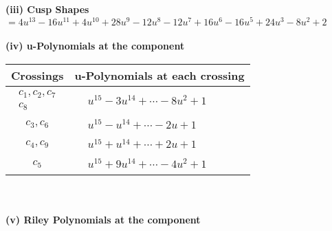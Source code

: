 \documentclass[1p]{elsarticle_modified}
\theoremstyle{definition}
\begin{document}
\flushleft \textbf{(iii) Cusp Shapes $= 4 u^{13}-16 u^{11}+4 u^{10}+28 u^9-12 u^8-12 u^7+16 u^6-16 u^5+24 u^3-8 u^2+2$}\\~\\
\newpage\renewcommand{\arraystretch}{1}
\flushleft \textbf{(iv) u-Polynomials at the component}\newline \\
\begin{tabular}{m{50pt}|m{274pt}}
Crossings & \hspace{64pt}u-Polynomials at each crossing \\
\hline $$\begin{aligned}c_{1},c_{2},c_{7}\\c_{8}\end{aligned}$$&$\begin{aligned}
&u^{15}-3 u^{14}+\cdots-8 u^2+1
\end{aligned}$\\
\hline $$\begin{aligned}c_{3},c_{6}\end{aligned}$$&$\begin{aligned}
&u^{15}- u^{14}+\cdots-2 u+1
\end{aligned}$\\
\hline $$\begin{aligned}c_{4},c_{9}\end{aligned}$$&$\begin{aligned}
&u^{15}+u^{14}+\cdots+2 u+1
\end{aligned}$\\
\hline $$\begin{aligned}c_{5}\end{aligned}$$&$\begin{aligned}
&u^{15}+9 u^{14}+\cdots-4 u^2+1
\end{aligned}$\\
\hline
\end{tabular}\\~\\
\newpage\renewcommand{\arraystretch}{1}
\flushleft \textbf{(v) Riley Polynomials at the component}\newline \\
\end{document}
